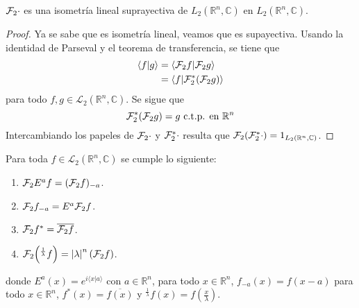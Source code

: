 \documentclass[12pt]{report}
\newcounter{it}
\theoremstyle{largebreak}
\newcommand\abs[1]{\ensuremath{\left|#1\right|}}
\newcommand\pint[2]{\ensuremath{\langle#1| #2\rangle}}
\newcommand\conj[1]{\ensuremath{\overline{#1}}}
\newcommand{\fou}[1]{\ensuremath{\mathcal{F}#1}}
\begin{document}
    \begin{theor}
        $\fou_2{\cdot}$ es una isometría lineal suprayectiva de $L_2(\mathbb{R}^n,\mathbb{C})$ en $L_2(\mathbb{R}^n,\mathbb{C})$.
    \end{theor}

    \begin{proof}
        Ya se sabe que es isometría lineal, veamos que es supayectiva. Usando la identidad de Parseval y el teorema de transferencia, se tiene que
        \begin{equation*}
            \begin{split}
                \pint{f}{g}&=\pint{\fou_2{f}}{\fou_2{g}}\\
                &=\pint{f}{\fou_2^*{(\fou_2{g})}}\\
            \end{split}
        \end{equation*}
        para todo $f,g\in\mathcal{L}_2(\mathbb{R}^n,\mathbb{C})$. Se sigue que
        \begin{equation*}
            \fou_2^*{(\fou_2{g})}=g\textup{ c.t.p. en }\mathbb{R}^n
        \end{equation*}
        Intercambiando los papeles de $\fou_2{\cdot}$ y $\fou_2^*{\cdot}$ resulta que $\fou_2{(\fou_2^*{\cdot})}=1_{L_2(\mathbb{R}^n,\mathbb{C})}$.
    \end{proof}

    \renewcommand{\theenumi}{\roman{enumi}}

    \begin{propo}
        Para toda $f\in\mathcal{L}_2(\mathbb{R}^n,\mathbb{C})$ se cumple lo siguiente:
        \begin{enumerate}
            \item $\fou_2{E^af}=(\fou_2{f})_{-a}$.
            \item $\fou_2{f_{-a}}=E^{a}\fou_2{f}$.
            \item $\fou_2{f^*}=\conj{\fou_2{f}}$.
            \item $\fou_2{\left(^{\frac{1}{\lambda}}f\right)}=\abs{\lambda}^n(\fou_2{f})$.
        \end{enumerate}
        donde $E^a(x)=e^{ i\pint{x}{a}}$ con $a\in\mathbb{R}^n$, para todo $x\in\mathbb{R}^n$, $f_{-a}(x)=f(x-a)$ para todo $x\in\mathbb{R}^n$, $f^*(x)=\conj{f(x)}$ y $^{\frac{1}{\lambda}}f(x)=f(\frac{x}{\lambda})$.
    \end{propo}
\end{document}
